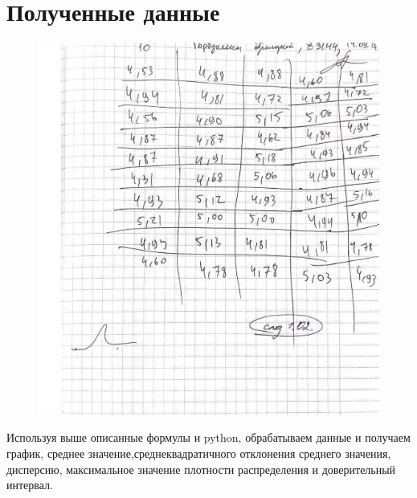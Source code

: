 \documentclass[a4paper]{article}
\begin{document}
\section{Полученные данные}


\begin{figure}[H]
	\includegraphics[scale=0.3]{1.png}
\end{figure}
Используя выше описанные формулы и python, обрабатываем данные и получаем график, среднее значение,среднеквадратичного отклонения среднего значения, дисперсию, максимальное значение плотности распределения и доверительный интервал.
\end{document}
